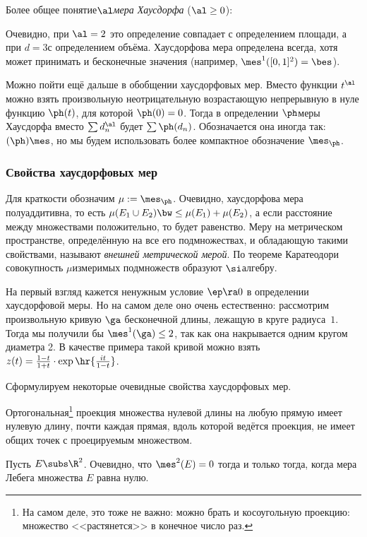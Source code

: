 \documentclass[a4paper]{article}
\begin{document}
\begin{df}
Более общее понятие\т \emph{$\al$\д мера Хаусдорфа} ($\al \ge 0$):
\end{df}

Очевидно, при $\al=2$ это определение совпадает с определением площади, а при $d=3$\т с определением объёма.
Хаусдорфова мера определена всегда, хотя может принимать и бесконечные значения (например, $\mes^1([0,1]^2)=\bes$).

Можно пойти ещё дальше в обобщении хаусдорфовых мер. Вместо функции $t^\al$ можно взять произвольную
неотрицательную возрастающую непрерывную в нуле функцию $\ph(t)$, для которой $\ph(0)=0$.
Тогда в определении $\ph$\д меры Хаусдорфа вместо $\sum d_n^\al$ будет $\sum \ph(d_n)$.
Обозначается она иногда так: $(\ph)\mes$, но мы будем использовать более компактное обозначение $\mes_\ph$.


\subsubsection{Свойства хаусдорфовых мер}

Для краткости  обозначим $\mu := \mes_\ph$. Очевидно, хаусдорфова мера полуаддитивна, то есть
$\mu(E_1\cup E_2) \bw\le \mu(E_1) +\mu(E_2)$, а если расстояние между множествами положительно, то будет равенство.
Меру на метрическом пространстве, определённую на все его подмножествах, и обладающую такими свойствами, называют
\emph{внешней метрической мерой}. По теореме Каратеодори совокупность $\mu$\д измеримых подмножеств
образуют $\si$\д алгебру.

На первый взгляд кажется ненужным условие $\ep\ra0$ в определении хаусдорфовой меры. Но на самом деле оно
очень естественно: рассмотрим произвольную кривую $\ga$ бесконечной длины, лежащую в круге радиуса~$1$.
Тогда мы получили бы $\mes^1(\ga)\le 2$, так как она накрывается одним кругом диаметра 2.
В качестве примера такой кривой можно взять $z(t) = \frac{1-t}{1+t}\cdot\exp\hr{\frac{it}{1-t}}$.


Сформулируем некоторые очевидные свойства хаусдорфовых мер.

\begin{points}{-1}
\item Ортогональная\footnote{На самом деле, это тоже не важно: можно брать и косоугольную проекцию: множество <<растянется>>
в конечное число раз.} проекция множества нулевой длины на любую прямую имеет нулевую длину, 
почти каждая прямая, вдоль которой ведётся проекция, не имеет общих точек с проецируемым множеством.
\item
Пусть $E\subs \R^2$. Очевидно, что $\mes^2(E)=0$ тогда и только тогда, когда мера Лебега множества $E$ равна нулю.
\end{points}
\end{document}
